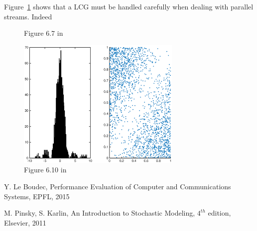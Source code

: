 \documentclass[10pt]{article}
\begin{document}
Figure~\ref{fig:67} shows that a LCG must be handled carefully when dealing with parallel streams. Indeed
\begin{figure}
  \centering
  \caption{Figure 6.7 in \cite{leb}}
  \label{fig:67}
\end{figure}

\begin{figure}
  \centering
  \includegraphics[width=0.7\textwidth]{images/hw2_1_610}
  \caption{Figure 6.10 in \cite{leb}}
  \label{fig:610}
\end{figure}

\begin{thebibliography}{10}

Y. Le Boudec, Performance Evaluation of Computer and Communications Systems, EPFL, 2015

M. Pinsky, S. Karlin, An Introduction to Stochastic Modeling, $4^{th}$ edition, Elsevier, 2011


\end{thebibliography}
\end{document}
